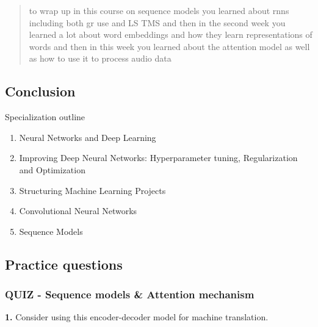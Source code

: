 \begin{quote}
     to wrap up in this course on sequence models you learned about rnns including both gr use and LS TMS and then in the second week you learned a lot about word embeddings and how they learn representations of words and then in this week you learned about the attention model as well as how to use it to process audio data
\end{quote}

\subsection{Conclusion}
Specialization outline
\begin{enumerate}
    \item Neural Networks and Deep Learning
    \item Improving Deep Neural Networks: Hyperparameter  
    tuning, Regularization and Optimization
    \item Structuring Machine Learning Projects
    \item Convolutional Neural Networks
    \item Sequence Models
\end{enumerate}

\subsection{Practice questions}
\subsubsection{QUIZ - Sequence models \& Attention mechanism}
\textbf{1.} Consider using this encoder-decoder model for machine translation.


